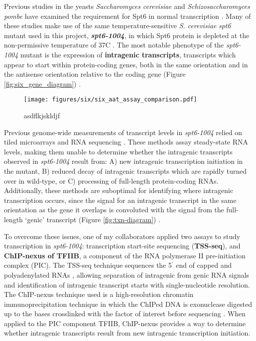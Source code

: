 Previous studies in the yeasts \textit{Saccharomyces cerevisiae} and \textit{Schizosaccharomyces pombe} have examined the requirement for Spt6 in normal transcription \citep{cheung2008, degennaro2013, kaplan2003, pathak2018, uwimana2017, vanbakel2013}.
Many of these studies make use of the same temperature-sensitive \textit{S. cerevisiae} \textit{spt6} mutant used in this project, \textbf{\textit{spt6-1004}}, in which Spt6 protein is depleted at the non-permissive temperature of 37\textdegree C \citep{kaplan2003}.
The most notable phenotype of the \textit{spt6-1004} mutant is the expression of \textbf{intragenic transcripts}, transcripts which appear to start within protein-coding genes, both in the same orientation and in the antisense orientation relative to the coding gene (Figure \ref{fig:six_gene_diagram}) \citep{cheung2008, degennaro2013, kaplan2003, uwimana2017}.

\begin{wrapfigure}[7]{r}{2.75in}
\centering
\texttt{[image: figures/six/six\_aat\_assay\_comparison.pdf]}
\caption[RNA-seq, TSS-seq, and TFIIB ChIP-nexus signal at the \textit{AAT2} gene, in \textit{spt6-1004} after 80 minutes at 37\textdegree C.]{asdflkjskldjf}
\label{fig:six_aat_assay_comparison}
\end{wrapfigure}

Previous genome-wide measurements of transcript levels in \textit{spt6-1004} relied on tiled microarrays \citep{cheung2008} and RNA sequencing \citep{uwimana2017}.
These methods assay steady-state RNA levels, making them unable to determine whether the intragenic transcripts observed in \textit{spt6-1004} result from: A) new intragenic transcription initiation in the mutant, B) reduced decay of intragenic transcripts which are rapidly turned over in wild-type, or C) processing of full-length protein-coding RNAs.
Additionally, these methods are suboptimal for identifying where intragenic transcription occurs, since the signal for an intragenic transcript in the same orientation as the gene it overlaps is convoluted with the signal from the full-length `genic' transcript (Figure \ref{fig:txn-diagram}) \citep{cheung2008, lickwar2009}.

To overcome these issues, one of my collaborators applied two assays to study transcription in \textit{spt6-1004}: transcription start-site sequencing (\textbf{TSS-seq}), and \textbf{ChIP-nexus of TFIIB}, a component of the RNA polymerase II pre-initiation complex (PIC).
The TSS-seq technique sequences the 5$^\prime$ end of capped and polyadenylated RNAs \citep{arribere2013, malabat2015}, allowing separation of intragenic from genic RNA signals and identification of intragenic transcript starts with single-nucleotide resolution.
The ChIP-nexus technique used is a high-resolution chromatin immunoprecipitation technique in which the ChIPed DNA is exonuclease digested up to the bases crosslinked with the factor of interest before sequencing \citep{he2015}.
When applied to the PIC component TFIIB, ChIP-nexus provides a way to determine whether intragenic transcripts result from new intragenic transcription initiation.

